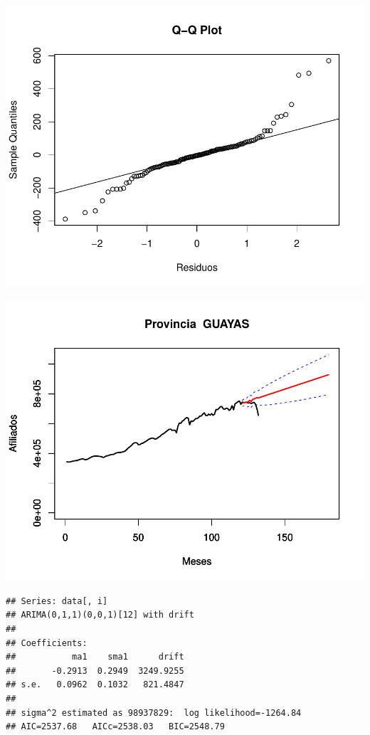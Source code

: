 \documentclass[11pt,a4paper,oneside]{article}\usepackage[]{graphicx}\usepackage[]{color}
\makeatletter
\def\maxwidth{ %
  \ifdim\Gin@nat@width>\linewidth
    \linewidth
  \else
    \Gin@nat@width
  \fi
}
\newenvironment{kframe}{%
 \def\at@end@of@kframe{}%
 \ifinner\ifhmode%
  \def\at@end@of@kframe{\end{minipage}}%
  \begin{minipage}{\columnwidth}%
 \fi\fi%
 \def\FrameCommand##1{\hskip\@totalleftmargin \hskip-\fboxsep
 \colorbox{shadecolor}{##1}\hskip-\fboxsep
     \hskip-\linewidth \hskip-\@totalleftmargin \hskip\columnwidth}%
 \MakeFramed {\advance\hsize-\width
   \@totalleftmargin\z@ \linewidth\hsize
   \@setminipage}}%
 {\par\unskip\endMakeFramed%
 \at@end@of@kframe}
\newenvironment{knitrout}{}{} %
\makeatother
\begin{document}
\begin{knitrout}
{}




{\centering \includegraphics[width=\maxwidth]{figure/unnamed-chunk-16-27} 

}




{\centering \includegraphics[width=\maxwidth]{figure/unnamed-chunk-16-28} 

}


\begin{kframe}\begin{verbatim}
## Series: data[, i] 
## ARIMA(0,1,1)(0,0,1)[12] with drift         
## 
## Coefficients:
##           ma1    sma1      drift
##       -0.2913  0.2949  3249.9255
## s.e.   0.0962  0.1032   821.4847
## 
## sigma^2 estimated as 98937829:  log likelihood=-1264.84
## AIC=2537.68   AICc=2538.03   BIC=2548.79
\end{verbatim}
\end{kframe}


\end{knitrout}
\end{document}
